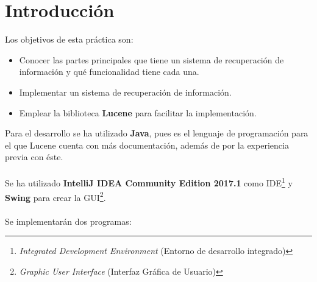 	
	
	
\setcounter{page}{0}

\maketitle %
\thispagestyle{empty}

\newpage %

\tableofcontents %

\newpage %

\listoffigures

\listoftables

\newpage


\section{Introducción}
\label{sec:intro}

Los objetivos de esta práctica son:

\begin{itemize}
	\item Conocer las partes principales que tiene un sistema de recuperación de información y qué funcionalidad tiene cada una.
	\item Implementar un sistema de recuperación de información.
	\item Emplear la biblioteca \textbf{Lucene} para facilitar la implementación.
\end{itemize}

Para el desarrollo se ha utilizado \textbf{Java}, pues es el lenguaje de programación para el que Lucene cuenta con más documentación, además de por la experiencia previa con éste.
\\ \\
Se ha utilizado \textbf{IntelliJ IDEA Community Edition 2017.1} como IDE\footnote{\textit{Integrated Development Environment} (Entorno de desarrollo integrado)} y \textbf{Swing} para crear la GUI\footnote{\textit{Graphic User Interface} (Interfaz Gráfica de Usuario)}.
\\ \\
Se implementarán dos programas:

